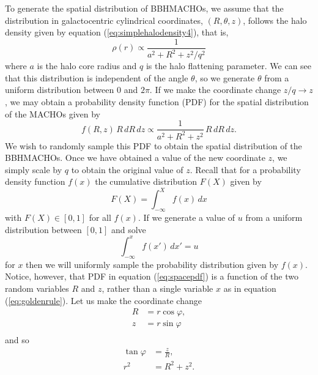 To generate the spatial distribution of BBHMACHOs, we assume that the
distribution in galactocentric cylindrical coordinates, $(R,\theta,z)$,
follows the halo density given by equation (\ref{eq:simplehalodensity4}),
that is,
\begin{equation}
\rho(r) \propto \frac{1}{a^2 + R^2 + z^2/q^2}
\end{equation}
where $a$ is the halo core radius and $q$ is the halo flattening parameter. We
can see that this distribution is independent of the angle $\theta$, so we
generate $\theta$ from a uniform distribution between $0$ and $2\pi$.  If
we make the coordinate change $z/q \rightarrow z$, we may obtain a
probability density function (PDF) for the spatial distribution of
the MACHOs given by
\begin{equation}
f(R,z)\,R\, dR\, dz \propto \frac{1}{a^2 + R^2 + z^2}\,R\, dR\, dz.
\label{eq:spacepdf}
\end{equation}
We wish to randomly sample this PDF to obtain the spatial distribution of
the BBHMACHOs. Once we have obtained a value of the new coordinate $z$, we
simply scale by $q$ to obtain the original value of $z$. Recall that for a
probability density function $f(x)$ the cumulative distribution $F(X)$
given by
\begin{equation}
F(X) = \int_{-\infty}^X f(x)\, dx
\end{equation}
with $F(X) \in [0,1]$ for all $f(x)$. If we generate a value of $u$ from
a uniform distribution between $[0,1]$ and solve
\begin{equation}
\int_{-\infty}^x f(x')\, dx' = u
\label{eq:goldenrule}
\end{equation}
for $x$ then we will uniformly sample the probability distribution given by
$f(x)$.  Notice, however, that PDF in equation (\ref{eq:spacepdf}) is a
function of the two random variables $R$ and $z$, rather than a single
variable $x$ as in equation (\ref{eq:goldenrule}).  Let us make the coordinate
change
\begin{equation}
\begin{split}
R &= r \cos \varphi, \\
z &= r \sin \varphi \\
\label{eq:probcoordtrans}
\end{split}
\end{equation}
and so
\begin{equation}
\begin{split}
\tan \varphi &= \frac{z}{R}, \\
r^2 &= R^2 + z^2. \\
\end{split}
\end{equation}
